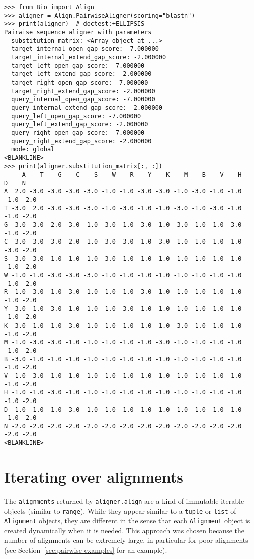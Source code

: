 \begin{verbatim}
>>> from Bio import Align
>>> aligner = Align.PairwiseAligner(scoring="blastn")
>>> print(aligner)  # doctest:+ELLIPSIS
Pairwise sequence aligner with parameters
  substitution_matrix: <Array object at ...>
  target_internal_open_gap_score: -7.000000
  target_internal_extend_gap_score: -2.000000
  target_left_open_gap_score: -7.000000
  target_left_extend_gap_score: -2.000000
  target_right_open_gap_score: -7.000000
  target_right_extend_gap_score: -2.000000
  query_internal_open_gap_score: -7.000000
  query_internal_extend_gap_score: -2.000000
  query_left_open_gap_score: -7.000000
  query_left_extend_gap_score: -2.000000
  query_right_open_gap_score: -7.000000
  query_right_extend_gap_score: -2.000000
  mode: global
<BLANKLINE>
>>> print(aligner.substitution_matrix[:, :])
     A    T    G    C    S    W    R    Y    K    M    B    V    H    D    N
A  2.0 -3.0 -3.0 -3.0 -3.0 -1.0 -1.0 -3.0 -3.0 -1.0 -3.0 -1.0 -1.0 -1.0 -2.0
T -3.0  2.0 -3.0 -3.0 -3.0 -1.0 -3.0 -1.0 -1.0 -3.0 -1.0 -3.0 -1.0 -1.0 -2.0
G -3.0 -3.0  2.0 -3.0 -1.0 -3.0 -1.0 -3.0 -1.0 -3.0 -1.0 -1.0 -3.0 -1.0 -2.0
C -3.0 -3.0 -3.0  2.0 -1.0 -3.0 -3.0 -1.0 -3.0 -1.0 -1.0 -1.0 -1.0 -3.0 -2.0
S -3.0 -3.0 -1.0 -1.0 -1.0 -3.0 -1.0 -1.0 -1.0 -1.0 -1.0 -1.0 -1.0 -1.0 -2.0
W -1.0 -1.0 -3.0 -3.0 -3.0 -1.0 -1.0 -1.0 -1.0 -1.0 -1.0 -1.0 -1.0 -1.0 -2.0
R -1.0 -3.0 -1.0 -3.0 -1.0 -1.0 -1.0 -3.0 -1.0 -1.0 -1.0 -1.0 -1.0 -1.0 -2.0
Y -3.0 -1.0 -3.0 -1.0 -1.0 -1.0 -3.0 -1.0 -1.0 -1.0 -1.0 -1.0 -1.0 -1.0 -2.0
K -3.0 -1.0 -1.0 -3.0 -1.0 -1.0 -1.0 -1.0 -1.0 -3.0 -1.0 -1.0 -1.0 -1.0 -2.0
M -1.0 -3.0 -3.0 -1.0 -1.0 -1.0 -1.0 -1.0 -3.0 -1.0 -1.0 -1.0 -1.0 -1.0 -2.0
B -3.0 -1.0 -1.0 -1.0 -1.0 -1.0 -1.0 -1.0 -1.0 -1.0 -1.0 -1.0 -1.0 -1.0 -2.0
V -1.0 -3.0 -1.0 -1.0 -1.0 -1.0 -1.0 -1.0 -1.0 -1.0 -1.0 -1.0 -1.0 -1.0 -2.0
H -1.0 -1.0 -3.0 -1.0 -1.0 -1.0 -1.0 -1.0 -1.0 -1.0 -1.0 -1.0 -1.0 -1.0 -2.0
D -1.0 -1.0 -1.0 -3.0 -1.0 -1.0 -1.0 -1.0 -1.0 -1.0 -1.0 -1.0 -1.0 -1.0 -2.0
N -2.0 -2.0 -2.0 -2.0 -2.0 -2.0 -2.0 -2.0 -2.0 -2.0 -2.0 -2.0 -2.0 -2.0 -2.0
<BLANKLINE>
\end{verbatim}

\section{Iterating over alignments}

The \verb+alignments+ returned by \verb+aligner.align+ are a kind of immutable iterable objects (similar to \verb+range+). While they appear similar to a \verb+tuple+ or \verb+list+ of \verb+Alignment+ objects, they are different in the sense that each \verb+Alignment+ object is created dynamically when it is needed. This approach was chosen because the number of alignments can be extremely large, in particular for poor alignments (see Section~\ref{sec:pairwise-examples} for an example).

